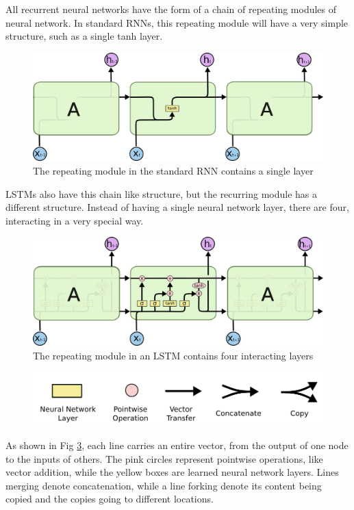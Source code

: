 \documentclass[12pt]{report}
\begin{document}
All recurrent neural networks have the form of a chain of repeating modules of neural network. In standard RNNs, this repeating module will have a very simple structure, such as a single tanh layer.
\begin{figure}
\centering
\includegraphics[width=5in]{lstm1.png}
\caption{The repeating module in the standard RNN contains a single layer}
\label{lstm1}
\end{figure}
LSTMs also have this chain like structure, but the recurring module has a different structure. Instead of having a single neural network layer, there are four, interacting in a very special way.
\begin{figure}
\centering
\includegraphics[width=5in]{lstm2.png}
\caption{The repeating module in an LSTM contains four interacting layers}
\label{lstm2}
\end{figure}
\begin{figure}
\centering
\includegraphics[width=5in]{lstm3.png}
\caption{}
\label{lstm3}
\end{figure}
As shown in Fig \ref{lstm3}, each line carries an entire vector, from the output of one node to the inputs of others. The pink circles represent pointwise operations, like vector addition, while the yellow boxes are learned neural network layers. Lines merging denote concatenation, while a line forking denote its content being copied and the copies going to different locations.
\end{document}
